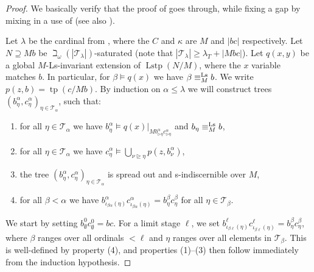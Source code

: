 \documentclass[a4paper, reqno]{amsart}
\theoremstyle{definition}
\theoremstyle{repeat}
\newcommand{\T}{\mathcal{T}}
\DeclareMathOperator{\tp}{tp}
\DeclareMathOperator{\Lstp}{Lstp}
\newcommand{\equivls}{\equiv^\textup{Ls}}
\begin{document}
\begin{proof}
We basically verify that the proof of \cite[Lemma 6.4]{kaplan_kim-independence_2020} goes through, while fixing a gap by mixing in a use of  (see also ).

Let $\lambda$ be the cardinal from , where the $C$ and $\kappa$ are $M$ and $|bc|$ respectively. Let $N \supseteq Mb$ be $\beth_\omega(|\T_\lambda|)$-saturated (note that $|\T_\lambda| \geq \lambda_T + |Mbc|$). Let $q(x, y)$ be a global $M$-Ls-invariant extension of $\Lstp(N/M)$, where the $x$ variable matches $b$. In particular, for $\beta \models q(x)$ we have $\beta \equivls_M b$. We write $p(z, b) = \tp(c/Mb)$. By induction on $\alpha \leq \lambda$ we will construct trees $(b^\alpha_\eta, c^\alpha_\eta)_{\eta \in \T_\alpha}$, such that:
\begin{enumerate}[label=(\arabic*)]
\item for all $\eta \in \T_\alpha$ we have $b^\alpha_\eta \models q(x)|_{M b^\alpha_{\rhd \eta} c^\alpha_{\rhd \eta}}$ and $b_\eta \equivls_M b$,
\item for all $\eta \in \T_\alpha$ we have $c^\alpha_\eta \models \bigcup_{\nu \unrhd \eta} p(z, b^\alpha_\nu)$,
\item the tree $(b^\alpha_\eta, c^\alpha_\eta)_{\eta \in \T_\alpha}$ is spread out and s-indiscernible over $M$,
\item for all $\beta < \alpha$ we have $b^\alpha_{\iota_{\beta \alpha}(\eta)} c^\alpha_{\iota_{\beta \alpha}(\eta)} = b^\beta_\eta c^\beta_\eta$ for all $\eta \in \T_\beta$.
\end{enumerate}
We start by setting $b^0_\emptyset c^0_\emptyset = bc$. For a limit stage $\ell$, we set $b^\ell_{\iota_{\beta \ell}(\eta)} c^\ell_{\iota_{\beta \ell}(\eta)} = b^\beta_\eta c^\beta_\eta$, where $\beta$ ranges over all ordinals $< \ell$ and $\eta$ ranges over all elements in $\T_\beta$. This is well-defined by property (4), and properties (1)--(3) then follow immediately from the induction hypothesis.


\end{proof}
\end{document}
